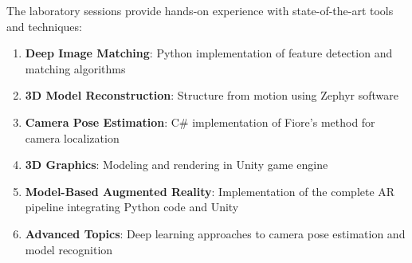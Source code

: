 \documentclass[11pt,a4paper]{article}
\theoremstyle{definition}
\theoremstyle{plain}
\theoremstyle{remark}
\begin{document}
The laboratory sessions provide hands-on experience with state-of-the-art tools and techniques:

\begin{enumerate}
    \item \textbf{Deep Image Matching}: Python implementation of feature detection and matching algorithms
    
    \item \textbf{3D Model Reconstruction}: Structure from motion using Zephyr software
    
    \item \textbf{Camera Pose Estimation}: C\# implementation of Fiore's method for camera localization
    
    \item \textbf{3D Graphics}: Modeling and rendering in Unity game engine
    
    \item \textbf{Model-Based Augmented Reality}: Implementation of the complete AR pipeline integrating Python code and Unity
    
    \item \textbf{Advanced Topics}: Deep learning approaches to camera pose estimation and model recognition
\end{enumerate}
 
\end{document}
